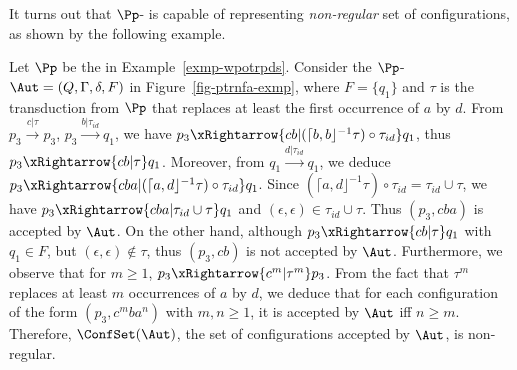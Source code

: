 It turns out that $\Pp$-{\WOTrNFA} is capable of representing \emph{non-regular} set of configurations, as %
shown by the following example.
\begin{example}
Let $\Pp$ be the {\WOTrPDS} in Example~\ref{exmp-wpotrpds}. Consider the $\Pp$-{\WOTrNFA} $\Aut = (Q, \Gamma, \delta, F)$ in Figure~\ref{fig-ptrnfa-exmp}, where $F= \{q_1\}$ and $\tau$ is the transduction from $\Pp$ that replaces at least the first occurrence of $a$ by $d$. From $p_3 \xrightarrow{c | \tau} p_3$, $p_3 \xrightarrow{b | \tau_{id}} q_1$, we have $p_3  \xRightarrow{c b | (\lceil b, b\rfloor^{-1} \tau) \circ \tau_{id}} q_1$, thus $p_3 \xRightarrow{cb | \tau} q_1$. Moreover, from $q_1 \xrightarrow{d | \tau_{id}} q_1$, we deduce $p_3 \xRightarrow{c b a | (\lceil a, d\rfloor^{-1} \tau) \circ \tau_{id}} q_1$. Since $(\lceil a, d\rfloor^{-1} \tau) \circ \tau_{id} = \tau_{id} \cup \tau$, we have $p_3 \xRightarrow{c b a |  \tau_{id} \cup \tau} q_1$ and $(\epsilon, \epsilon) \in \tau_{id} \cup \tau$. Thus $(p_3, cba)$ is accepted by $\Aut$. On the other hand, although $p_3 \xRightarrow{cb | \tau} q_1$ with $q_1 \in F$, but $(\epsilon, \epsilon) \not \in \tau$, thus $(p_3, cb)$ is not accepted by $\Aut$.  Furthermore, we observe that for $m \ge 1$, $p_3 \xRightarrow{c^m | \tau^m} p_3$. From the fact that $\tau^m$ replaces at least $m$ occurrences of $a$ by $d$, we deduce that for each configuration of the form $(p_3, c^m b a^n)$ with $m,n \ge 1$, it is accepted by $\Aut$ iff $n \ge m$.  Therefore, $\ConfSet(\Aut)$, the set of configurations accepted by $\Aut$, is non-regular. 
%
\begin{figure}[htb]
    \centering

\end{figure}
\end{example}
